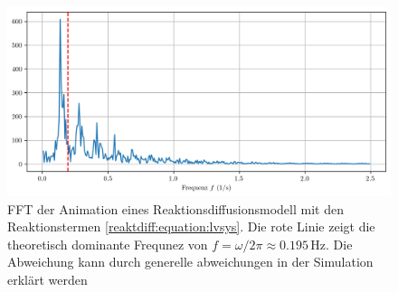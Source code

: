 \begin{figure}
    \centering
    \includegraphics[width=\linewidth]{papers/reaktdiff/images/LotkaVolterra/fft_plot_latex.png}
    \caption{FFT der Animation eines Reaktionsdiffusionsmodell mit den Reaktionstermen \eqref{reaktdiff:equation:lvsys}. Die rote Linie zeigt die theoretisch dominante Frequnez von \(f = \omega / 2 \pi \approx 0.195\,\text{Hz}\). Die Abweichung kann durch generelle abweichungen in der Simulation erklärt werden}
    \label{reaktdiff:fig:lvfft}
\end{figure}
